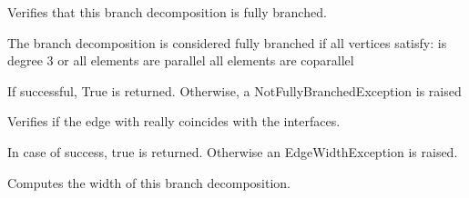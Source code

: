 \documentclass[letterpaper,12pt,english]{sphinxmanual}
\begin{document}
\begin{fulllineitems}
\begin{fulllineitems}
\label{\detokenize{api/modules:cbmpy.fluxmodules.decomposition.Decomposition.verifyFullyBranched}}
\pysigstartsignatures
\pysiglinewithargsret
{}
{}
{}
\pysigstopsignatures
\sphinxAtStartPar
Verifies that this branch decomposition is fully branched.

\sphinxAtStartPar
The branch decomposition is considered fully branched if all vertices
satisfy:
\sphinxhyphen{} is degree 3 or
\sphinxhyphen{} all elements are parallel
\sphinxhyphen{} all elements are coparallel

\sphinxAtStartPar
If successful, True is returned.
Otherwise, a NotFullyBranchedException is raised

\end{fulllineitems}


\begin{fulllineitems}
\label{\detokenize{api/modules:cbmpy.fluxmodules.decomposition.Decomposition.verifyEdgeWidth}}
\pysigstartsignatures
\pysiglinewithargsret
{}
{}
{}
\pysigstopsignatures
\sphinxAtStartPar
Verifies if the edge with really coincides with the interfaces.

\sphinxAtStartPar
In case of success, true is returned. Otherwise an EdgeWidthException is raised.

\end{fulllineitems}


\begin{fulllineitems}
\label{\detokenize{api/modules:cbmpy.fluxmodules.decomposition.Decomposition.getWidth}}
\pysigstartsignatures
\pysiglinewithargsret
{}
{}
{}
\pysigstopsignatures
\sphinxAtStartPar
Computes the width of this branch decomposition.

\end{fulllineitems}



\end{fulllineitems}
\end{document}
